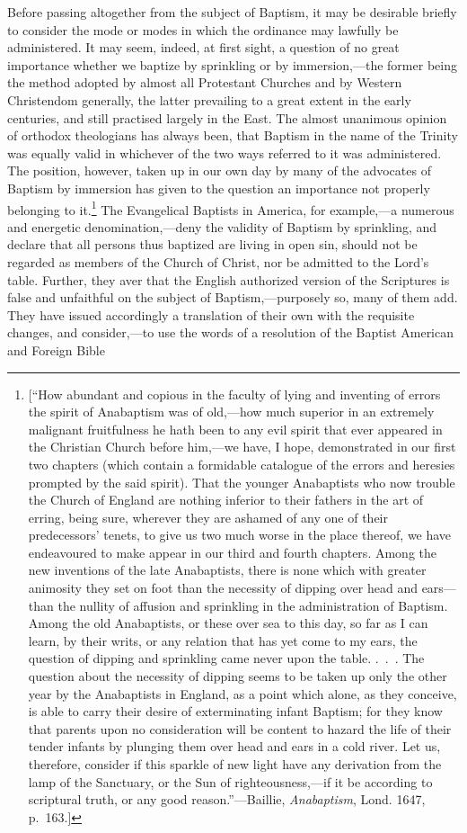 \documentclass[
]{book}
\begin{document}
Before passing altogether from the subject of Baptism, it may be desirable briefly to consider the mode or modes in which the ordinance may lawfully be administered. It may seem, indeed, at first sight, a question of no great importance whether we baptize by sprinkling or by immersion,---the former being the method adopted by almost all Protestant Churches and by Western Christendom generally, the latter prevailing to a great extent in the early centuries, and still practised largely in the East. The almost unanimous opinion of orthodox theologians has always been, that Baptism in the name of the Trinity was equally valid in whichever of the two ways referred to it was administered. The position, however, taken up in our own day by many of the advocates of Baptism by immersion has given to the question an importance not properly belonging to it.\footnote{{[}``How abundant and copious in the faculty of lying and inventing of errors the spirit of Anabaptism was of old,---how much superior in an extremely malignant fruitfulness he hath been to any evil spirit that ever appeared in the Christian Church before him,---we have, I hope, demonstrated in our first two chapters (which contain a formidable catalogue of the errors and heresies prompted by the said spirit). That the younger Anabaptists who now trouble the Church of England are nothing inferior to their fathers in the art of erring, being sure, wherever they are ashamed of any one of their predecessors' tenets, to give us two much worse in the place thereof, we have endeavoured to make appear in our third and fourth chapters. Among the new inventions of the late Anabaptists, there is none which with greater animosity they set on foot than the necessity of dipping over head and ears---than the nullity of affusion and sprinkling in the administration of Baptism. Among the old Anabaptists, or these over sea to this day, so far as I can learn, by their writs, or any relation that has yet come to my ears, the question of dipping and sprinkling came never upon the table. .~.~. The question about the necessity of dipping seems to be taken up only the other year by the Anabaptists in England, as a point which alone, as they conceive, is able to carry their desire of exterminating infant Baptism; for they know that parents upon no consideration will be content to hazard the life of their tender infants by plunging them over head and ears in a cold river. Let us, therefore, consider if this sparkle of new light have any derivation from the lamp of the Sanctuary, or the Sun of righteousness,---if it be according to scriptural truth, or any good reason.''---Baillie, \emph{Anabaptism}, Lond. 1647, p.~163.{]}} The Evangelical Baptists in America, for example,---a numerous and energetic denomination,---deny the validity of Baptism by sprinkling, and declare that all persons thus baptized are living in open sin, should not be regarded as members of the Church of Christ, nor be admitted to the Lord's table. Further, they aver that the English authorized version of the Scriptures is false and unfaithful on the subject of Baptism,---purposely so, many of them add. They have issued accordingly a translation of their own with the requisite changes, and consider,---to use the words of a resolution of the Baptist American and Foreign Bible 
\end{document}
